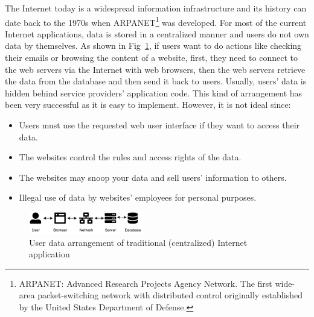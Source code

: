 The Internet today is a widespread information infrastructure and its history can date back to the 1970s when ARPANET\footnote{ARPANET: Advanced Research Projects Agency Network.
    The first wide-area packet-switching network with distributed control originally established by the United States Department of Defense.} was developed.
For most of the current Internet applications, data is stored in a centralized manner and users do not own data by themselves. As shown in Fig~\ref{fig:traditional_internet},
if users want to do actions like checking their emails or browsing the content of a website, first, they need to connect to the web servers via the Internet with web browsers, then the web servers retrieve the data from the database and then send it back to users.
Usually, users' data is hidden behind service providers' application code. This kind of arrangement has been very successful as it is easy to implement. However, it is not ideal since:
\begin{itemize}
    \item Users must use the requested web user interface if they want to access their data.
    \item The websites control the rules and access rights of the data.
    \item The websites may snoop your data and sell users' information to others.
    \item Illegal use of data by websites' employees for personal purposes.
\end{itemize}

\begin{figure}[h]
    \includegraphics[width=0.45\textwidth,trim={-1cm 0 0.25cm 0},clip]{figs/traditional_internet.pdf}
    \caption{User data arrangement of traditional (centralized) Internet application}
    \label{fig:traditional_internet}
\end{figure}

